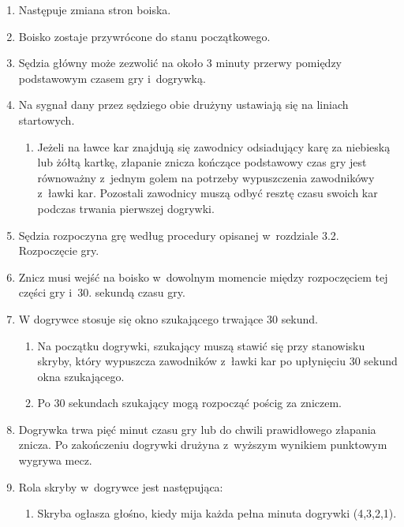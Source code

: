 \documentclass[12pt,a4paper]{article}
\begin{document}
\begin{enumerate}
	\item Następuje zmiana stron boiska.

	\item Boisko zostaje przywrócone do stanu początkowego.

	\item Sędzia główny może zezwolić na około 3 minuty przerwy pomiędzy
	      podstawowym czasem gry i~dogrywką.

	\item Na sygnał dany przez sędziego obie drużyny ustawiają się na liniach
	      startowych.
	      \begin{enumerate}
		      \item Jeżeli na ławce kar znajdują się zawodnicy odsiadujący karę za
		            niebieską lub żółtą kartkę, złapanie znicza kończące podstawowy czas gry
		            jest równoważny z~jednym golem na potrzeby wypuszczenia zawodnikówy z~ławki kar. Pozostali zawodnicy muszą odbyć resztę czasu swoich kar
		            podczas trwania pierwszej dogrywki.
	      \end{enumerate}

	\item Sędzia rozpoczyna grę według procedury opisanej w~rozdziale 3.2.
	      Rozpoczęcie gry.

	\item Znicz musi wejść na boisko w~dowolnym momencie między rozpoczęciem
	      tej części gry i~30. sekundą czasu gry.

	\item W dogrywce stosuje się okno szukającego trwające 30 sekund.
	      \begin{enumerate}
		      \item Na początku dogrywki, szukający muszą stawić się przy stanowisku
		            skryby, który wypuszcza zawodników z~ławki kar po upłynięciu 30 sekund
		            okna szukającego.

		      \item Po 30 sekundach szukający mogą rozpocząć pościg za zniczem.
	      \end{enumerate}

	\item Dogrywka trwa pięć minut czasu gry lub do chwili prawidłowego
	      złapania znicza. Po zakończeniu dogrywki drużyna z~wyższym wynikiem
	      punktowym wygrywa mecz.

	\item Rola skryby w~dogrywce jest następująca:
	      \begin{enumerate}
		      \item  Skryba ogłasza głośno, kiedy mija każda pełna minuta dogrywki
		            (4,3,2,1).


\end{enumerate}
\end{enumerate}
\end{document}
